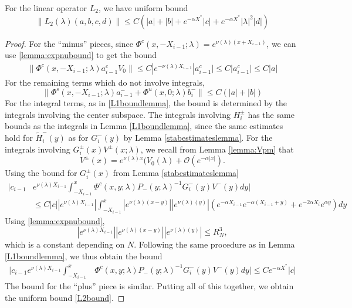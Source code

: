 \documentclass[thesis.tex]{subfiles}
\begin{document}
\begin{lemma}\label{L2boundlemma}
For the linear operator $L_2$, we have uniform bound
\begin{equation}\label{L2bound}
\| L_2(\lambda) (a,b,c,d) \| \leq C\left(|a| + |b| + e^{-\alpha X^*} |c| + e^{-\alpha X^*}|\lambda|^2|d|\right)
\end{equation}
\begin{proof}
For the ``minus'' pieces, since $\Phi^c(x, -X_{i-1}; \lambda) = e^{\nu(\lambda)(x + X_{i-1})}$, we can use \cref{lemma:expnubound} to get the bound
\begin{align*}
\| \Phi^c(x, -X_{i-1}; \lambda) a_{i-1}^c V_0 \| \leq C |e^{-\nu(\lambda)X_{i-1}}|a_{i-1}^c| \leq C |a_{i-1}^c| \leq C |a|
\end{align*}
For the remaining terms which do not involve integrals,
\[
\| \Phi^s(x, -X_{i-1}; \lambda) a_{i-1}^- + \Phi^u(x, 0; \lambda) b_i^- \| \leq C(|a| + |b|)
\]
For the integral terms, as in \cref{L1boundlemma}, the bound is determined by the integrals involving the center subspace. The integrals involving $H_i^\pm$ has the same bounds as the integrals in Lemma \ref{L1boundlemma}, since the same estimates hold for $\tilde{H}_i^-(y)$ as for $G_i^-(y)$ by Lemma \ref{stabestimateslemma}. For the integrals involving $G_i^\pm(x) V^\pm(x; \lambda)$, we recall from Lemma \ref{lemma:Vpm} that
\[
V^\pm(x) = e^{\nu(\lambda)x}(V_0(\lambda) + \mathcal{O}(e^{-\alpha |x| }).
\]
Using the bound for $G_i^\pm(x)$ from Lemma \ref{stabestimateslemma}
\begin{align*}
\Bigg| c_{i-1} &e^{\nu(\lambda)X_{i-1}} \int_{-X_{i-1}}^x \Phi^c(x, y; \lambda) P_-(y; \lambda)^{-1} G_i^-(y) V^-(y) dy \Bigg| \\ 
&\leq C |c| \left| e^{\nu(\lambda)X_{i-1}} \right| \int_{-X_{i-1}}^x \left| e^{\nu(\lambda)(x - y)} \right| \left|e^{\nu(\lambda)(y)}\right| \left( e^{-\alpha X_{i-1}} e^{-\alpha(X_{i-1} + y) } + e^{-2 \alpha X_i} e^{\alpha y} \right) dy
\end{align*}
Using \cref{lemma:expnubound}, 
\[
\left| e^{\nu(\lambda)X_{i-1}} \right| \left| e^{\nu(\lambda)(x - y)} \right| \left|e^{\nu(\lambda)(y)}\right| \leq R_N^3,
\]
which is a constant depending on $N$. Following the same procedure as in Lemma \ref{L1boundlemma}, we thus obtain the bound
\begin{align}\label{intGVpmbound}
\Bigg| c_{i-1} e^{\nu(\lambda)X_{i-1}} \int_{-X_{i-1}}^x &\Phi^c(x, y; \lambda) P_-(y; \lambda)^{-1} G_i^-(y) V^-(y) dy \Bigg| \leq C e^{-\alpha X^*} |c| 
\end{align}
The bound for the ``plus'' piece is similar. Putting all of this together, we obtain the uniform bound \cref{L2bound}.
\end{proof}
\end{lemma}
\end{document}
